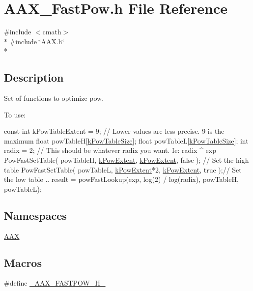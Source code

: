 \hypertarget{a00212}{}\section{A\+A\+X\+\_\+\+Fast\+Pow.\+h File Reference}
\label{a00212}
{\ttfamily \#include $<$cmath$>$}\\*
{\ttfamily \#include \char`\"{}A\+A\+X.\+h\char`\"{}}\\*


\subsection{Description}
Set of functions to optimize pow. 

To use\+: 
\begin{DoxyCode}
\textcolor{keyword}{const} \textcolor{keywordtype}{int} kPowTableExtent = 9;      \textcolor{comment}{// Lower values are less precise. 9 is the maximum}
\textcolor{keywordtype}{float} powTableH[\hyperlink{a00288_a59f1ab59ea51ed94f87e8d935870df9e}{kPowTableSize}];
\textcolor{keywordtype}{float} powTableL[\hyperlink{a00288_a59f1ab59ea51ed94f87e8d935870df9e}{kPowTableSize}];
\textcolor{keywordtype}{int} radix = 2;                      \textcolor{comment}{// This should be whatever radix you want. Ie: radix ^ exp}
PowFastSetTable( powTableH, \hyperlink{a00288_a4e6fcac015bb083018e8897563966cf6}{kPowExtent}, \hyperlink{a00288_a4e6fcac015bb083018e8897563966cf6}{kPowExtent}, \textcolor{keyword}{false} ); \textcolor{comment}{// Set the high table}
PowFastSetTable( powTableL, \hyperlink{a00288_a4e6fcac015bb083018e8897563966cf6}{kPowExtent}*2, \hyperlink{a00288_a4e6fcac015bb083018e8897563966cf6}{kPowExtent}, \textcolor{keyword}{true} );\textcolor{comment}{// Set the low table}
..
result = powFastLookup(exp, log(2) / log(radix), powTableH, powTableL);
\end{DoxyCode}
 \subsection*{Namespaces}
\begin{DoxyCompactItemize}
\item 
 \hyperlink{a00288}{A\+A\+X}
\end{DoxyCompactItemize}
\subsection*{Macros}
\begin{DoxyCompactItemize}
\item 
\#define \hyperlink{a00212_ac6d8a45526d6683f24769be9e942fc4e}{\+\_\+\+A\+A\+X\+\_\+\+F\+A\+S\+T\+P\+O\+W\+\_\+\+H\+\_\+}
\end{DoxyCompactItemize}
